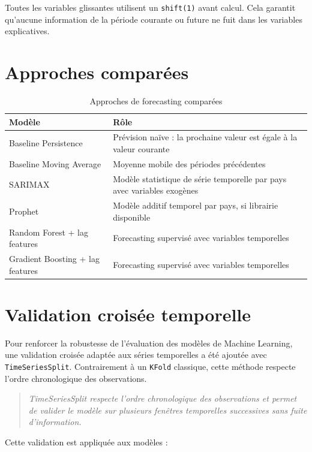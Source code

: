 \documentclass[11pt,a4paper]{report}
\begin{document}
Toutes les variables glissantes utilisent un \texttt{shift(1)} avant calcul. Cela garantit qu'aucune information de la période courante ou future ne fuit dans les variables explicatives.

\section{Approches comparées}

\begin{table}[H]
\centering
\caption{Approches de forecasting comparées}
\begin{tabularx}{\textwidth}{lX}
\toprule
\textbf{Modèle} & \textbf{Rôle} \\
\midrule
Baseline Persistence & Prévision naïve : la prochaine valeur est égale à la valeur courante \\
Baseline Moving Average & Moyenne mobile des périodes précédentes \\
SARIMAX & Modèle statistique de série temporelle par pays avec variables exogènes \\
Prophet & Modèle additif temporel par pays, si librairie disponible \\
Random Forest + lag features & Forecasting supervisé avec variables temporelles \\
Gradient Boosting + lag features & Forecasting supervisé avec variables temporelles \\
\bottomrule
\end{tabularx}
\end{table}

\section{Validation croisée temporelle}

Pour renforcer la robustesse de l'évaluation des modèles de Machine Learning, une validation croisée adaptée aux séries temporelles a été ajoutée avec \texttt{TimeSeriesSplit}. Contrairement à un \texttt{KFold} classique, cette méthode respecte l'ordre chronologique des observations.

\begin{quote}
\textit{TimeSeriesSplit respecte l'ordre chronologique des observations et permet de valider le modèle sur plusieurs fenêtres temporelles successives sans fuite d'information.}
\end{quote}

Cette validation est appliquée aux modèles :
\end{document}
